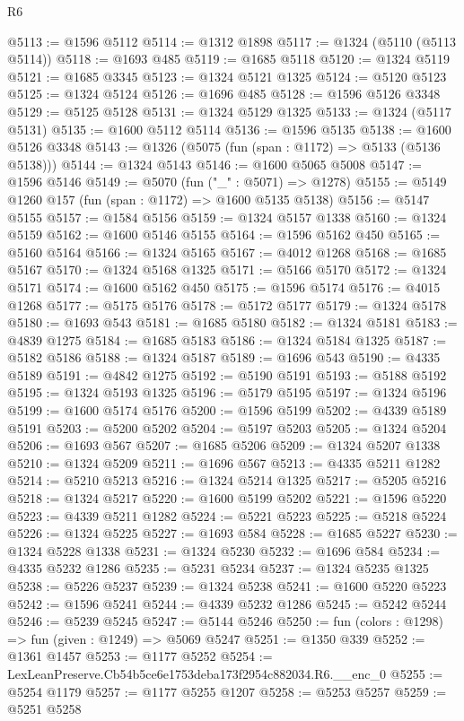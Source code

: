 \begin{lexlean}{R6}
\begin{coremodule}
@5113 := @1596 @5112
@5114 := @1312 @1898
@5117 := @1324 (@5110 (@5113 @5114))
@5118 := @1693 @485
@5119 := @1685 @5118
@5120 := @1324 @5119
@5121 := @1685 @3345
@5123 := @1324 @5121 @1325
@5124 := @5120 @5123
@5125 := @1324 @5124
@5126 := @1696 @485
@5128 := @1596 @5126 @3348
@5129 := @5125 @5128
@5131 := @1324 @5129 @1325
@5133 := @1324 (@5117 @5131)
@5135 := @1600 @5112 @5114
@5136 := @1596 @5135
@5138 := @1600 @5126 @3348
@5143 := @1326 (@5075 (fun (span : @1172) => @5133 (@5136 @5138)))
@5144 := @1324 @5143
@5146 := @1600 @5065 @5008
@5147 := @1596 @5146
@5149 := @5070 (fun ("_" : @5071) => @1278)
@5155 := @5149 @1260 @157 (fun (span : @1172) => @1600 @5135 @5138)
@5156 := @5147 @5155
@5157 := @1584 @5156
@5159 := @1324 @5157 @1338
@5160 := @1324 @5159
@5162 := @1600 @5146 @5155
@5164 := @1596 @5162 @450
@5165 := @5160 @5164
@5166 := @1324 @5165
@5167 := @4012 @1268
@5168 := @1685 @5167
@5170 := @1324 @5168 @1325
@5171 := @5166 @5170
@5172 := @1324 @5171
@5174 := @1600 @5162 @450
@5175 := @1596 @5174
@5176 := @4015 @1268
@5177 := @5175 @5176
@5178 := @5172 @5177
@5179 := @1324 @5178
@5180 := @1693 @543
@5181 := @1685 @5180
@5182 := @1324 @5181
@5183 := @4839 @1275
@5184 := @1685 @5183
@5186 := @1324 @5184 @1325
@5187 := @5182 @5186
@5188 := @1324 @5187
@5189 := @1696 @543
@5190 := @4335 @5189
@5191 := @4842 @1275
@5192 := @5190 @5191
@5193 := @5188 @5192
@5195 := @1324 @5193 @1325
@5196 := @5179 @5195
@5197 := @1324 @5196
@5199 := @1600 @5174 @5176
@5200 := @1596 @5199
@5202 := @4339 @5189 @5191
@5203 := @5200 @5202
@5204 := @5197 @5203
@5205 := @1324 @5204
@5206 := @1693 @567
@5207 := @1685 @5206
@5209 := @1324 @5207 @1338
@5210 := @1324 @5209
@5211 := @1696 @567
@5213 := @4335 @5211 @1282
@5214 := @5210 @5213
@5216 := @1324 @5214 @1325
@5217 := @5205 @5216
@5218 := @1324 @5217
@5220 := @1600 @5199 @5202
@5221 := @1596 @5220
@5223 := @4339 @5211 @1282
@5224 := @5221 @5223
@5225 := @5218 @5224
@5226 := @1324 @5225
@5227 := @1693 @584
@5228 := @1685 @5227
@5230 := @1324 @5228 @1338
@5231 := @1324 @5230
@5232 := @1696 @584
@5234 := @4335 @5232 @1286
@5235 := @5231 @5234
@5237 := @1324 @5235 @1325
@5238 := @5226 @5237
@5239 := @1324 @5238
@5241 := @1600 @5220 @5223
@5242 := @1596 @5241
@5244 := @4339 @5232 @1286
@5245 := @5242 @5244
@5246 := @5239 @5245
@5247 := @5144 @5246
@5250 := fun (colors : @1298) => fun (given : @1249) => @5069 @5247
@5251 := @1350 @339
@5252 := @1361 @1457
@5253 := @1177 @5252
@5254 := LexLeanPreserve.Cb54b5ce6e1753deba173f2954c882034.R6.__enc_0
@5255 := @5254 @1179
@5257 := @1177 @5255 @1207
@5258 := @5253 @5257
@5259 := @5251 @5258

\end{coremodule}
\end{lexlean}
